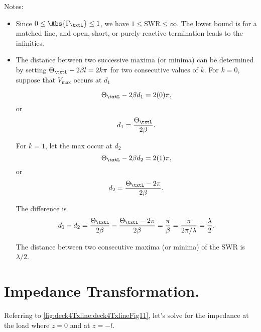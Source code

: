 Notes:
\begin{itemize}
\item Since \( 0 \le \Abs{\Gamma_\txtL} \le 1 \), we have \( 1 \le \textrm{SWR} \le \infty \).  The lower bound is for a matched line, and open, short, or purely reactive termination leads to the infinities.
\item The distance between two successive maxima (or minima) can be determined by setting \( \Theta_\txtL - 2 \beta l = 2 k \pi \) for two consecutive values of \( k \).  For \( k = 0 \), suppose that \( V_{\mathrm{max}} \) occurs at \( d_1 \)

\begin{dmath}\label{eqn:uwaves4TransmissionLines:1220}
\Theta_\txtL - 2 \beta d_1 = 2 (0) \pi,
\end{dmath}
or
\begin{dmath}\label{eqn:uwaves4TransmissionLines:1240}
d_1 = \frac{\Theta_\txtL}{2 \beta}.
\end{dmath}

For \( k = 1 \), let the max occur at \( d_2 \)
\begin{dmath}\label{eqn:uwaves4TransmissionLines:1260}
\Theta_\txtL - 2 \beta d_2 = 2 (1) \pi,
\end{dmath}
or
\begin{dmath}\label{eqn:uwaves4TransmissionLines:1280}
d_2 = \frac{\Theta_\txtL - 2 \pi}{2 \beta}.
\end{dmath}

The difference is
\begin{dmath}\label{eqn:uwaves4TransmissionLines:1300}
d_1 - d_2
= \frac{\Theta_\txtL}{2 \beta} - \frac{\Theta_\txtL - 2 \pi}{2 \beta}
= \frac{\pi}{\beta}
= \frac{\pi}{2 \pi/\lambda}
= \frac{\lambda}{2}.
\end{dmath}

The distance between two consecutive maxima (or minima) of the SWR is \( \lambda/2 \).
\end{itemize}
\section{Impedance Transformation.}
Referring to \cref{fig:deck4Txline:deck4TxlineFig11}, let's solve for the impedance at the load where \( z = 0 \) and at \( z = -l \).

